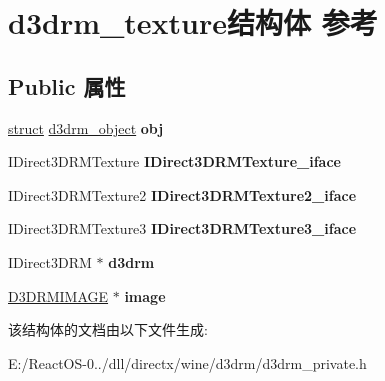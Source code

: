\hypertarget{structd3drm__texture}{}\section{d3drm\+\_\+texture结构体 参考}
\label{structd3drm__texture}
\subsection*{Public 属性}
\begin{DoxyCompactItemize}
\item 
\mbox{\label{structd3drm__texture_aea4a09c768b0a2c3d7f9fec52e35e116}} 
\hyperlink{interfacestruct}{struct} \hyperlink{structd3drm__object}{d3drm\+\_\+object} {\bfseries obj}
\item 
\mbox{\label{structd3drm__texture_add343cd446ea93e1aeeb6604fcac9203}} 
I\+Direct3\+D\+R\+M\+Texture {\bfseries I\+Direct3\+D\+R\+M\+Texture\+\_\+iface}
\item 
\mbox{\label{structd3drm__texture_abc138af559ed7c44f5c1d4bb79fd2567}} 
I\+Direct3\+D\+R\+M\+Texture2 {\bfseries I\+Direct3\+D\+R\+M\+Texture2\+\_\+iface}
\item 
\mbox{\label{structd3drm__texture_a33df2312bf7762cf45c8509cfc903f9a}} 
I\+Direct3\+D\+R\+M\+Texture3 {\bfseries I\+Direct3\+D\+R\+M\+Texture3\+\_\+iface}
\item 
\mbox{\label{structd3drm__texture_a1470e99eb7d3cc6da45ed8c34a979aa5}} 
I\+Direct3\+D\+RM $\ast$ {\bfseries d3drm}
\item 
\mbox{\label{structd3drm__texture_a9f82eb524ad0161a9ec66d48fa06658d}} 
\hyperlink{struct___d3_d_r_m_i_m_a_g_e}{D3\+D\+R\+M\+I\+M\+A\+GE} $\ast$ {\bfseries image}
\end{DoxyCompactItemize}


该结构体的文档由以下文件生成\+:\begin{DoxyCompactItemize}
\item 
E\+:/\+React\+O\+S-\/0../dll/directx/wine/d3drm/d3drm\+\_\+private.\+h\end{DoxyCompactItemize}
